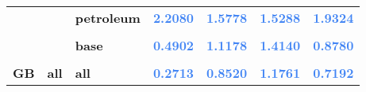 \documentclass[
  authoryear,
  preprint,
  3p]{elsarticle}
\begin{document}
\begin{longtable}[t]{>{}l>{}l>{}l>{}r>{}r>{}r>{}r}
\textbf{} & \textbf{} & \textbf{petroleum} & \textcolor[HTML]{4285f4}{\textbf{2.2080}} & \textcolor[HTML]{4285f4}{\textbf{1.5778}} & \textcolor[HTML]{4285f4}{\textbf{1.5288}} & \textcolor[HTML]{4285f4}{\textbf{1.9324}}\\
\textbf{\cellcolor{gray!10}{}} & \textbf{\cellcolor{gray!10}{metals}} & \textbf{\cellcolor{gray!10}{all}} & \textcolor[HTML]{4285f4}{\textbf{\cellcolor{gray!10}{0.6320}}} & \textcolor[HTML]{4285f4}{\textbf{\cellcolor{gray!10}{1.1252}}} & \textcolor[HTML]{4285f4}{\textbf{\cellcolor{gray!10}{1.1212}}} & \textcolor[HTML]{4285f4}{\textbf{\cellcolor{gray!10}{0.9131}}}\\
\textbf{} & \textbf{} & \textbf{base} & \textcolor[HTML]{4285f4}{\textbf{0.4902}} & \textcolor[HTML]{4285f4}{\textbf{1.1178}} & \textcolor[HTML]{4285f4}{\textbf{1.4140}} & \textcolor[HTML]{4285f4}{\textbf{0.8780}}\\
\addlinespace
\textbf{\cellcolor{gray!10}{}} & \textbf{\cellcolor{gray!10}{}} & \textbf{\cellcolor{gray!10}{precious}} & \textcolor[HTML]{4285f4}{\textbf{\cellcolor{gray!10}{0.6674}}} & \textcolor[HTML]{4285f4}{\textbf{\cellcolor{gray!10}{1.1271}}} & \textcolor[HTML]{4285f4}{\textbf{\cellcolor{gray!10}{1.0480}}} & \textcolor[HTML]{4285f4}{\textbf{\cellcolor{gray!10}{0.9219}}}\\
\textbf{GB} & \textbf{all} & \textbf{all} & \textcolor[HTML]{4285f4}{\textbf{0.2713}} & \textcolor[HTML]{4285f4}{\textbf{0.8520}} & \textcolor[HTML]{4285f4}{\textbf{1.1761}} & \textcolor[HTML]{4285f4}{\textbf{0.7192}}\\
\bottomrule

\end{longtable}

\endgroup{}

\newpage
\end{document}
